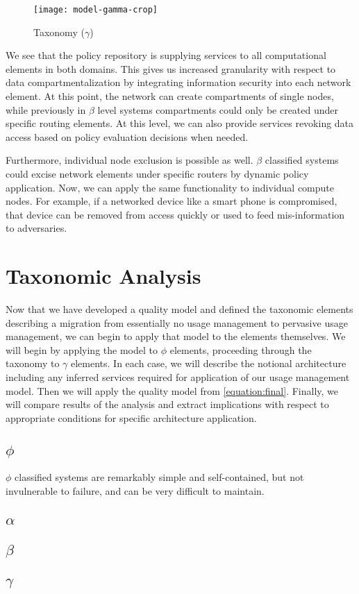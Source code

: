 \begin{figure}[!t]
\centering
\texttt{[image: model-gamma-crop]}
\caption{Taxonomy ($\gamma$)}
\label{fig:model:taxonomy-gamma}
\end{figure}

We see that the policy repository is supplying services to all computational elements in both domains.  This gives us increased granularity with respect to data compartmentalization by integrating information security into each network element.  At this point, the network can create compartments of single nodes, while previously in $\beta$ level systems compartments could only be created under specific routing elements.  At this level, we can also provide services revoking data access based on policy evaluation decisions when needed.

Furthermore, individual node exclusion is possible as well. $\beta$ classified systems could excise network elements under specific routers by dynamic policy application.  Now, we can apply the same functionality to individual compute nodes.  For example, if a networked device like a smart phone is compromised, that device can be removed from access quickly or used to feed mis-information to adversaries.

\section{Taxonomic Analysis}
Now that we have developed a quality model and defined the taxonomic elements describing a migration from essentially no usage management to pervasive usage management, we can begin to apply that model to the elements themselves.  We will begin by applying the model to $\phi$ elements, proceeding through the taxonomy to $\gamma$ elements.  In each case, we will describe the notional architecture including any inferred services required for application of our usage management model.  Then we will apply the quality model from \ref{equation:final}.  Finally, we will compare results of the analysis and extract implications with respect to appropriate conditions for specific architecture application.

\subsection{$\phi$}
$\phi$ classified systems are remarkably simple and self-contained, but not invulnerable to failure, and can be very difficult to maintain.

\subsection{$\alpha$}

\subsection{$\beta$}

\subsection{$\gamma$}